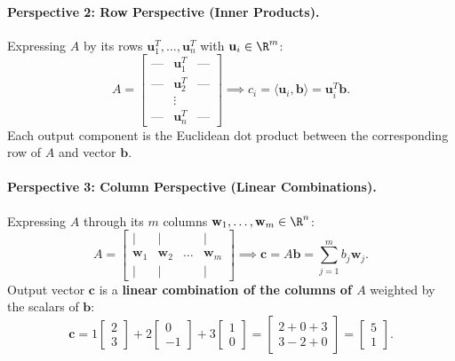 \paragraph{Perspective 2: Row Perspective (Inner Products).}
Expressing $A$ by its rows $\mathbf{u}_1^T, \dots, \mathbf{u}_n^T$ with $\mathbf{u}_i \in \R^m$:
\begin{equation}
    A = \begin{bmatrix} \text{---} & \mathbf{u}_1^T & \text{---} \\ \text{---} & \mathbf{u}_2^T & \text{---} \\ & \vdots & \\ \text{---} & \mathbf{u}_n^T & \text{---} \end{bmatrix} \implies c_i = \langle \mathbf{u}_i, \mathbf{b} \rangle = \mathbf{u}_i^T \mathbf{b}.
\end{equation}
Each output component is the Euclidean dot product between the corresponding row of $A$ and vector $\mathbf{b}$.

\paragraph{Perspective 3: Column Perspective (Linear Combinations).}
Expressing $A$ through its $m$ columns $\mathbf{w}_1, \dots, \mathbf{w}_m \in \R^n$:
\begin{equation}
    A = \begin{bmatrix} | & | & & | \\ \mathbf{w}_1 & \mathbf{w}_2 & \dots & \mathbf{w}_m \\ | & | & & | \end{bmatrix} \implies \mathbf{c} = A \mathbf{b} = \sum_{j=1}^m b_j \mathbf{w}_j.
\end{equation}
Output vector $\mathbf{c}$ is a \textbf{linear combination of the columns of $A$} weighted by the scalars of $\mathbf{b}$:
\begin{equation}
    \mathbf{c} = 1 \begin{bmatrix} 2 \\ 3 \end{bmatrix} + 2 \begin{bmatrix} 0 \\ -1 \end{bmatrix} + 3 \begin{bmatrix} 1 \\ 0 \end{bmatrix} = \begin{bmatrix} 2 + 0 + 3 \\ 3 - 2 + 0 \end{bmatrix} = \begin{bmatrix} 5 \\ 1 \end{bmatrix}.
\end{equation}

